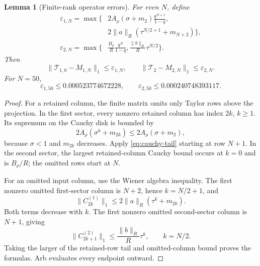 \documentclass[11pt]{article}
\newtheorem{lemma}[theorem]{Lemma}
\theoremstyle{definition}
\theoremstyle{remark}
\newcommand{\cT}{\mathcal T}
\begin{document}
\begin{lemma}[Finite-rank operator errors]
\label{lem:finite-rank-errors}
For even $N$, define
\begin{align}
 \varepsilon_{1,N}
 =\max\Bigg\{&
 2A_\rho(\sigma+m_2)\frac{q^{N+1}}{1-q},\nonumber\\[-0.2em]
 &2\|a\|_R\left(\tau^{N/2+1}+m_{N+2}\right)
 \Bigg\},
 \label{eq:epsilon-one}\\
 \varepsilon_{2,N}
 =\max\Bigg\{&
 \frac{B_\rho}{R}\frac{q^N}{1-q},
 \frac{\|b\|_R}{R}\tau^{N/2}
 \Bigg\}.
 \label{eq:epsilon-two}
\end{align}
Then
\begin{equation}\label{eq:operator-errors}
 \|\cT_{1,0}-M_{1,N}\|_1\le\varepsilon_{1,N},
 \qquad
 \|\cT_2-M_{2,N}\|_1\le\varepsilon_{2,N}.
\end{equation}
For $N=50$,
\begin{equation}\label{eq:error-values}
 \varepsilon_{1,50}\le0.000523774672228,
 \qquad
 \varepsilon_{2,50}\le0.000240748393117.
\end{equation}
\end{lemma}

\begin{proof}
For a retained column, the finite matrix omits only Taylor rows above the
projection.  In the first sector, every nonzero retained column has index
$2k$, $k\ge1$.  Its supremum on the Cauchy disk is bounded by
\begin{equation}\label{eq:low-column-one}
 2A_\rho(\sigma^k+m_{2k})
 \le2A_\rho(\sigma+m_2),
\end{equation}
because $\sigma<1$ and $m_{2k}$ decreases.  Apply
\eqref{eq:cauchy-tail} starting at row $N+1$.  In the second sector, the
largest retained-column Cauchy bound occurs at $k=0$ and is $B_\rho/R$;
the omitted rows start at $N$.

For an omitted input column, use the Wiener algebra inequality.  The first
nonzero omitted first-sector column is $N+2$, hence $k=N/2+1$, and
\begin{equation}\label{eq:high-column-one}
 \|C^{(1)}_{2k}\|_1
 \le2\|a\|_R(\tau^k+m_{2k}).
\end{equation}
Both terms decrease with $k$.  The first nonzero omitted second-sector column
is $N+1$, giving
\begin{equation}\label{eq:high-column-two}
 \|C^{(2)}_{2k+1}\|_1
 \le\frac{\|b\|_R}{R}\tau^k,
 \qquad k=N/2.
\end{equation}
Taking the larger of the retained-row tail and omitted-column bound proves
the formulas.  Arb evaluates every endpoint outward.
\end{proof}
\end{document}
